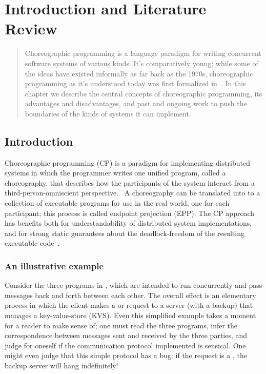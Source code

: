 \chapter{Introduction and Literature Review}

\begin{quote}
Choreographic programming is a language paradigm for writing concurrent software systems of various kinds.
It's comparatively young; while some of the ideas have existed informally as far back as the 1970s,
choreographic programming as it's understood today was first formalized in~.
In this chapter we describe the central concepts of choreographic programming,
its advantages and disadvantages,
and past and ongoing work to push the boundaries of the kinds of systems it can implement.
\end{quote}

\section{Introduction}

Choreographic programming (CP)
is a paradigm for implementing distributed systems in which the programmer writes one unified program, called a choreography,
that describes how the participants of the system interact
from a third-person-omniscient perspective.~
A choreography can be translated into to a collection of executable programs for use in the real world, one for each participant;
this process is called endpoint projection (EPP).
The CP approach has benefits both for understandability of distributed system implementations,
and for strong static guarantees about the deadlock-freedom of the resulting executable code~\cite{montesi-carbone-dfbd}.

\subsection{An illustrative example}

Consider the three programs in ,
which are intended to run concurrently and pass messages back and forth between each other.
The overall effect is an elementary process in which the client makes a  or  request to
a server (with a backup) that manages a key-value-store (KVS).
Even this simplified example takes a moment for a reader to make sense of;
one must read the three programs, infer the correspondence between messages sent and received by the three parties,
and judge for oneself if the communication protocol implemented is sensical.
One might even judge that this simple protocol has a bug:
if the request is a , the backup server will hang indefinitely!

